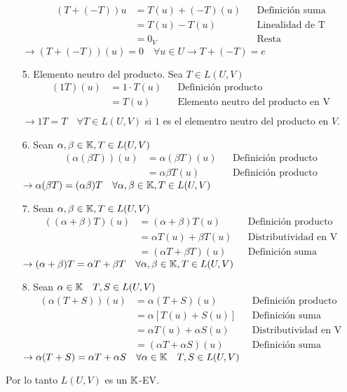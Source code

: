 \begin{mdframed}[style=s]
\begin{enumerate}
                \begin{align*}
                    (T+(-T))u&=T(u)+(-T)(u)&&\text{Definición suma}\\
                    &=T(u)-T(u)&&\text{Linealidad de T}\\
                    &=0_V&&\text{Resta}
                \end{align*}
                $\to (T+(-T))(u)=0\quad\forall u\in U\to T+(-T)=e$
            \item[5.] Elemento neutro del producto. Sea $T\in L(U,V)$
                \begin{align*}
                    (1T)(u)&=1\cdot T(u)&&\text{Definición producto}\\
                    &=T(u)&&\text{Elemento neutro del producto en V}\\
                \end{align*}
                $\to 1T=T \quad\forall T\in L(U,V)$ si $1$ es el elementro neutro del producto en $V$.
            \item[6.] Sean $\alpha,\beta\in\mathbb{K},T\in L(U,V)$
                \begin{align*}
                    (\alpha(\beta T))(u)&=\alpha(\beta T)(u)&&\text{Definición producto}\\
                    &=\alpha\beta T(u)&&\text{Definición producto}
                \end{align*}
                $\to \alpha(\beta T)=(\alpha\beta)T\quad\forall\alpha,\beta\in\mathbb{K},T\in L(U,V)$
            \item[7.] Sean $\alpha,\beta\in\mathbb{K},T\in L(U,V)$
                \begin{align*}
                    ((\alpha+\beta)T)(u)&=(\alpha+\beta)T(u)&&\text{Definición producto}\\
                    &=\alpha T(u)+\beta T(u)&&\text{Distributividad en V}\\
                    &=(\alpha T+\beta T)(u)&&\text{Definición suma}
                \end{align*}
                $\to (\alpha+\beta)T=\alpha T+\beta T\quad\forall\alpha,\beta\in\mathbb{K},T\in L(U,V)$
            \item[8.] Sean $\alpha\in\mathbb{K}\quad T,S\in L(U,V)$
                \begin{align*}
                    (\alpha(T+S))(u)&=\alpha(T+S)(u)&&\text{Definición producto}\\
                    &=\alpha[T(u)+S(u)]&&\text{Definición suma}\\
                    &=\alpha T(u)+\alpha S(u)&&\text{Distributividad en V}\\
                    &=(\alpha T+\alpha S)(u)&&\text{Definición suma}
                \end{align*}
                $\to \alpha(T+S)=\alpha T+\alpha S\quad\forall\alpha\in\mathbb{K}\quad T,S\in L(U,V)$
        \end{enumerate}
        Por lo tanto $L(U,V)$ es un $\mathbb{K}$-EV.
    \end{mdframed}